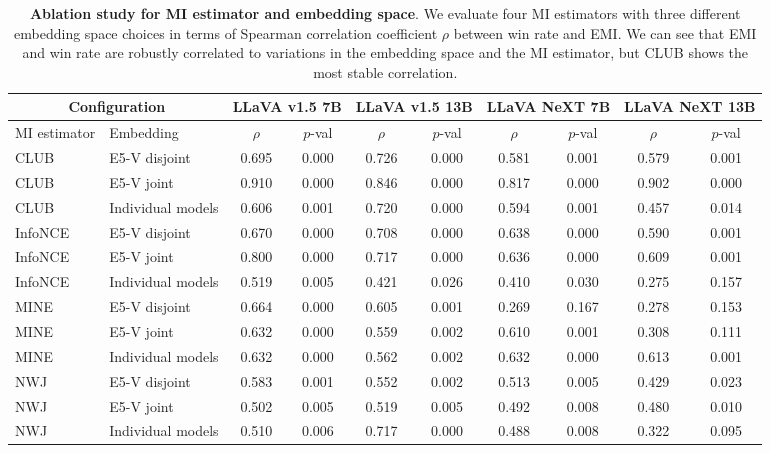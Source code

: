 \begin{table}[th]
\caption{\textbf{Ablation study for MI estimator and embedding space}. We evaluate four MI estimators with three different embedding space choices in terms of Spearman correlation coefficient $\rho$ between win rate and EMI. We can see that EMI and win rate are robustly correlated to variations in the embedding space and the MI estimator, but CLUB shows the most stable correlation.}
\small
\centering
\begin{tabular}{@{}ll|cccccccc@{}}
\toprule
\multicolumn{2}{c}{Configuration} &
  \multicolumn{2}{c}{LLaVA v1.5 7B} &
  \multicolumn{2}{c}{LLaVA v1.5 13B} &
  \multicolumn{2}{c}{LLaVA NeXT 7B} &
  \multicolumn{2}{c}{LLaVA NeXT 13B} \\ \midrule
MI estimator & Embedding         & $\rho$   & $p$-val & $\rho$   & $p$-val & $\rho$   & $p$-val & $\rho$   & $p$-val \\ \midrule
CLUB         & E5-V disjoint      & 0.695 & 0.000 & 0.726 & 0.000 & 0.581 & 0.001 & 0.579 & 0.001 \\
CLUB         & E5-V joint         & 0.910 & 0.000 & 0.846 & 0.000 & 0.817 & 0.000 & 0.902 & 0.000 \\
CLUB         & Individual models & 0.606 & 0.001 & 0.720 & 0.000 & 0.594 & 0.001 & 0.457 & 0.014 \\
InfoNCE      & E5-V disjoint      & 0.670 & 0.000 & 0.708 & 0.000 & 0.638 & 0.000 & 0.590 & 0.001 \\
InfoNCE      & E5-V joint         & 0.800 & 0.000 & 0.717 & 0.000 & 0.636 & 0.000 & 0.609 & 0.001 \\
InfoNCE      & Individual models & 0.519 & 0.005 & 0.421 & 0.026 & 0.410 & 0.030 & 0.275 & 0.157 \\
MINE         & E5-V disjoint      & 0.664 & 0.000 & 0.605 & 0.001 & 0.269 & 0.167 & 0.278 & 0.153 \\
MINE         & E5-V joint         & 0.632 & 0.000 & 0.559 & 0.002 & 0.610 & 0.001 & 0.308 & 0.111 \\
MINE         & Individual models & 0.632 & 0.000 & 0.562 & 0.002 & 0.632 & 0.000 & 0.613 & 0.001 \\
NWJ          & E5-V disjoint      & 0.583 & 0.001 & 0.552 & 0.002 & 0.513 & 0.005 & 0.429 & 0.023 \\
NWJ          & E5-V joint         & 0.502 & 0.005 & 0.519 & 0.005 & 0.492 & 0.008 & 0.480 & 0.010 \\
NWJ          & Individual models & 0.510 & 0.006 & 0.717 & 0.000 & 0.488 & 0.008 & 0.322 & 0.095 \\ \bottomrule
\end{tabular} \label{tab:ablation_emiwr}
\end{table}